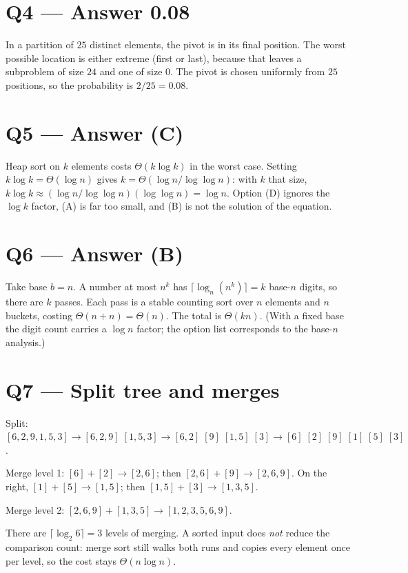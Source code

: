 \documentclass[11pt]{article}
\begin{document}
\section*{Q4 --- Answer 0.08}

In a partition of $25$ distinct elements, the pivot is in its final position. The worst possible location is either extreme (first or last), because that leaves a subproblem of size $24$ and one of size $0$. The pivot is chosen uniformly from $25$ positions, so the probability is $2/25 = 0.08$.

\section*{Q5 --- Answer (C)}

Heap sort on $k$ elements costs $\Theta(k\log k)$ in the worst case. Setting $k\log k = \Theta(\log n)$ gives $k = \Theta(\log n/\log\log n)$: with $k$ that size, $k\log k \approx (\log n/\log\log n)(\log\log n) = \log n$. Option (D) ignores the $\log k$ factor, (A) is far too small, and (B) is not the solution of the equation.

\section*{Q6 --- Answer (B)}

Take base $b=n$. A number at most $n^k$ has $\lceil\log_n(n^k)\rceil = k$ base-$n$ digits, so there are $k$ passes. Each pass is a stable counting sort over $n$ elements and $n$ buckets, costing $\Theta(n+n)=\Theta(n)$. The total is $\Theta(kn)$. (With a fixed base the digit count carries a $\log n$ factor; the option list corresponds to the base-$n$ analysis.)

\section*{Q7 --- Split tree and merges}

Split: $[6,2,9,1,5,3]\to[6,2,9]\;[1,5,3]\to[6,2]\;[9]\;[1,5]\;[3]\to[6]\;[2]\;[9]\;[1]\;[5]\;[3]$.

Merge level 1: $[6]+[2]\to[2,6]$; then $[2,6]+[9]\to[2,6,9]$. On the right, $[1]+[5]\to[1,5]$; then $[1,5]+[3]\to[1,3,5]$.

Merge level 2: $[2,6,9]+[1,3,5]\to[1,2,3,5,6,9]$.

There are $\lceil\log_2 6\rceil = 3$ levels of merging. A sorted input does \emph{not} reduce the comparison count: merge sort still walks both runs and copies every element once per level, so the cost stays $\Theta(n\log n)$.
\end{document}
